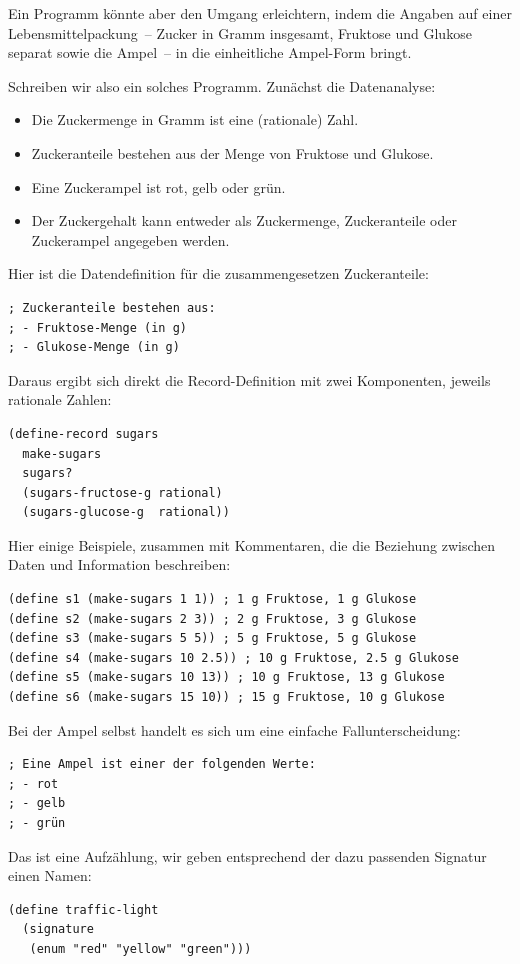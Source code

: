 Ein Programm könnte aber den Umgang erleichtern, indem die
Angaben auf einer Lebensmittelpackung~-- Zucker in Gramm insgesamt,
Fruktose und Glukose separat sowie die Ampel~-- in die einheitliche
Ampel-Form bringt.

Schreiben wir also ein solches Programm.  Zunächst
die Datenanalyse:
%
\begin{itemize}
\item Die Zuckermenge in Gramm ist eine (rationale) Zahl.
\item Zuckeranteile bestehen aus der Menge von Fruktose und Glukose.
\item Eine Zuckerampel ist rot, gelb oder grün.
\item Der Zuckergehalt kann entweder als Zuckermenge, Zuckeranteile
  oder Zuckerampel angegeben werden.
\end{itemize}
%
Hier ist die Datendefinition für die zusammengesetzen Zuckeranteile:
%
\begin{lstlisting}
; Zuckeranteile bestehen aus:
; - Fruktose-Menge (in g)
; - Glukose-Menge (in g)
\end{lstlisting}
%
Daraus ergibt sich direkt die Record-Definition mit zwei Komponenten,
jeweils rationale Zahlen:
%
\begin{lstlisting}
(define-record sugars
  make-sugars
  sugars?
  (sugars-fructose-g rational)
  (sugars-glucose-g  rational))
\end{lstlisting}
%
Hier einige Beispiele, zusammen mit Kommentaren, die die Beziehung
zwischen Daten und Information beschreiben:
%
\begin{lstlisting}
(define s1 (make-sugars 1 1)) ; 1 g Fruktose, 1 g Glukose
(define s2 (make-sugars 2 3)) ; 2 g Fruktose, 3 g Glukose
(define s3 (make-sugars 5 5)) ; 5 g Fruktose, 5 g Glukose
(define s4 (make-sugars 10 2.5)) ; 10 g Fruktose, 2.5 g Glukose
(define s5 (make-sugars 10 13)) ; 10 g Fruktose, 13 g Glukose
(define s6 (make-sugars 15 10)) ; 15 g Fruktose, 10 g Glukose
\end{lstlisting}
%
Bei der Ampel selbst handelt es sich um eine einfache
Fallunterscheidung:
%
\begin{lstlisting}
; Eine Ampel ist einer der folgenden Werte:
; - rot
; - gelb
; - grün
\end{lstlisting}
%
Das ist eine Aufzählung, wir geben entsprechend der dazu passenden
Signatur einen Namen:
%
\begin{lstlisting}
(define traffic-light
  (signature
   (enum "red" "yellow" "green")))
\end{lstlisting}

